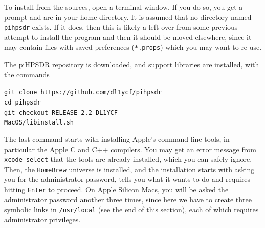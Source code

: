 \documentclass[12pt]{book}
\def\grtt#1{\texttt{\color{magenta}#1}}
\begin{document}
To install from the sources, open a terminal window. If you do so, you get
a prompt and are in your home directory. It is assumed that no directory named \texttt{pihpsdr}
exists. If it does, then this is likely a left-over from some previous
attempt to install the program and then it should be moved elsewhere, since it may contain
files with saved preferences (\texttt{*.props}) which you may want to re-use.

The piHPSDR repository is downloaded, and support libraries are installed, with the commands

\grtt{git clone https://github.com/dl1ycf/pihpsdr} \\
\grtt{cd pihpsdr} \\
\grtt{git checkout RELEASE-2.2-DL1YCF} \\
\grtt{MacOS/libinstall.sh} \\


\begin{center}
\end{center}

The last command starts with installing Apple's command line tools, in particular the Apple C and C++
compilers. You may get an error message from \texttt{xcode-select} that the tools are already
installed, which you can safely ignore. Then, the
 \texttt{HomeBrew} universe is installed, and the installation starts with asking you for the administrator
 password, tells you what it wants to do and requires hitting \texttt{Enter} to proceed.
 On Apple Silicon Macs, you will be asked the administrator password another three times,
 since here we have to create three symbolic links in \texttt{/usr/local} (see the end of this section),
 each of which requires administrator privileges. 
 
\end{document}
